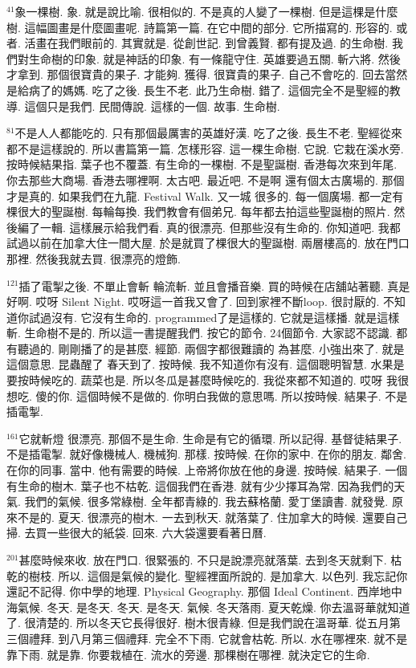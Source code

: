 \documentclass{book}
\begin{document}
$^{41}$象一棵樹.
象.
就是說比喻.
很相似的.
不是真的人變了一棵樹.
但是這棵是什麼樹.
這幅圖畫是什麼圖畫呢.
詩篇第一篇.
在它中間的部分.
它所描寫的.
形容的.
或者.
活畫在我們眼前的.
其實就是.
從創世記.
到曾義賢.
都有提及過.
的生命樹.
我們對生命樹的印象.
就是神話的印象.
有一條龍守住.
英雄要過五關.
斬六將.
然後才拿到.
那個很寶貴的果子.
才能夠.
獲得.
很寶貴的果子.
自己不會吃的.
回去當然是給病了的媽媽.
吃了之後.
長生不老.
此乃生命樹.
錯了.
這個完全不是聖經的教導.
這個只是我們.
民間傳說.
這樣的一個.
故事.
生命樹.

$^{81}$不是人人都能吃的.
只有那個最厲害的英雄好漢.
吃了之後.
長生不老.
聖經從來都不是這樣說的.
所以書篇第一篇.
怎樣形容.
這一棵生命樹.
它說.
它栽在溪水旁.
按時候結果指.
葉子也不覆蓋.
有生命的一棵樹.
不是聖誕樹.
香港每次來到年尾.
你去那些大商場.
香港去哪裡啊.
太古吧.
最近吧.
不是啊 還有個太古廣場的.
那個才是真的.
如果我們在九龍.
Festival Walk.
又一城 很多的.
每一個廣場.
都一定有棵很大的聖誕樹.
每輪每換.
我們教會有個弟兄.
每年都去拍這些聖誕樹的照片.
然後編了一輯.
這樣展示給我們看.
真的很漂亮.
但那些沒有生命的.
你知道吧.
我都試過以前在加拿大住一間大屋.
於是就買了棵很大的聖誕樹.
兩層樓高的.
放在門口那裡.
然後我就去買.
很漂亮的燈飾.

$^{121}$插了電掣之後.
不單止會斬 輪流斬.
並且會播音樂.
買的時候在店舖站著聽.
真是好啊.
哎呀 Silent Night.
哎呀這一首我又會了.
回到家裡不斷loop.
很討厭的.
不知道你試過沒有.
它沒有生命的.
programmed了是這樣的.
它就是這樣播.
就是這樣斬.
生命樹不是的.
所以這一書提醒我們.
按它的節令.
24個節令.
大家認不認識.
都有聽過的.
剛剛播了的是甚麼.
經節.
兩個字都很難讀的 為甚麼.
小強出來了.
就是這個意思.
昆蟲醒了 春天到了.
按時候.
我不知道你有沒有.
這個聰明智慧.
水果是要按時候吃的.
蔬菜也是.
所以冬瓜是甚麼時候吃的.
我從來都不知道的.
哎呀 我很想吃.
傻的你.
這個時候不是做的.
你明白我做的意思嗎.
所以按時候.
結果子.
不是插電掣.

$^{161}$它就斬燈 很漂亮.
那個不是生命.
生命是有它的循環.
所以記得.
基督徒結果子.
不是插電掣.
就好像機械人.
機械狗.
那樣.
按時候.
在你的家中.
在你的朋友.
鄰舍.
在你的同事.
當中.
他有需要的時候.
上帝將你放在他的身邊.
按時候.
結果子.
一個有生命的樹木.
葉子也不枯乾.
這個我們在香港.
就有少少擇耳為常.
因為我們的天氣.
我們的氣候.
很多常綠樹.
全年都青綠的.
我去蘇格蘭.
愛丁堡讀書.
就發覺.
原來不是的.
夏天.
很漂亮的樹木.
一去到秋天.
就落葉了.
住加拿大的時候.
還要自己掃.
去買一些很大的紙袋.
回來.
六大袋還要看著日曆.

$^{201}$甚麼時候來收.
放在門口.
很緊張的.
不只是說漂亮就落葉.
去到冬天就剩下.
枯乾的樹枝.
所以.
這個是氣候的變化.
聖經裡面所說的.
是加拿大.
以色列.
我忘記你還記不記得.
你中學的地理.
Physical Geography.
那個 Ideal Continent.
西岸地中海氣候.
冬天.
是冬天.
冬天.
是冬天.
氣候.
冬天落雨.
夏天乾燥.
你去溫哥華就知道了.
很清楚的.
所以冬天它長得很好.
樹木很青綠.
但是我們說在溫哥華.
從五月第三個禮拜.
到八月第三個禮拜.
完全不下雨.
它就會枯乾.
所以.
水在哪裡來.
就不是靠下雨.
就是靠.
你要栽植在.
流水的旁邊.
那棵樹在哪裡.
就決定它的生命.
\end{document}
